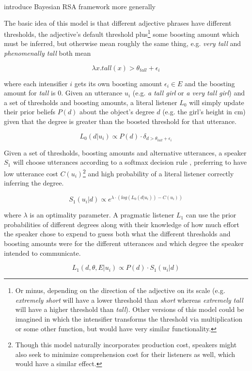 \documentclass[10pt,letterpaper]{article}
\newcommand{\w}[1]{\emph{#1}}
\newcommand{\todo}[1]{{\color{red}#1}}
\begin{document}
\todo{introduce Bayesian RSA framework more generally}

The basic idea of this model is that different adjective phrases have different thresholds, the adjective's default threshold plus\footnote{Or minus, depending on the direction of the adjective on its scale (e.g. \w{extremely short} will have a lower threshold than \w{short} whereas \w{extremely tall} will have a higher threshold than \w{tall}). Other versions of this model could be imagined in which the intensifier transforms the threshold via multiplication or some other function, but would have very similar functionality.} some boosting amount which must be inferred, but otherwise mean roughly the same thing, e.g. \w{very tall} and \w{phenomenally tall} both mean

\[ \lambda x . tall(x) > \theta_{tall} + \epsilon_i \]

where each intensifier $i$ gets its own boosting amount $\epsilon_i \in E$ and the boosting amount for \w{tall} is 0. 
Given an utterance $u_i$ (e.g. \w{a tall girl} or \w{a very tall girl}) and a set of thresholds and boosting amounts, a literal listener $L_0$ will simply update their prior beliefs $P(d)$ about the object's degree $d$ (e.g. the girl's height in cm) given that the degree is greater than the boosted threshold for that utterance.

\[ L_0(d | u_i) \propto P(d) \cdot \delta_{d > \theta_{tall} + \epsilon_i } \]

Given a set of thresholds, boosting amounts and alternative utterances, a speaker $S_1$ will choose utterances according to a softmax decision rule \cite{sutton}, preferring to have low utterance cost $C(u_i)$\footnote{Though this model naturally incorporates production cost, speakers might also seek to minimize comprehension cost for their listeners as well, which would have a similar effect.}
and high probability of a literal listener correctly inferring the degree.

\[ S_1(u_i | d) \propto e^{\lambda \cdot ( log(L_0(d | u_i)) - C(u_i) )} \]

where $\lambda$ is an optimality parameter. A pragmatic listener $L_1$ can use the prior probabilities of different degrees along with their knowledge of how much effort the speaker chose to expend to guess both what the different thresholds and boosting amounts were for the different utterances and which degree the speaker intended to communicate.

\[ L_1(d, \theta, E | u_i) \propto P(d) \cdot S_1(u_i | d) \]
\end{document}
